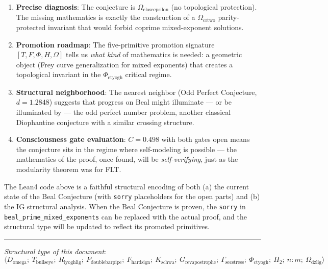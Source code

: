 \documentclass[12pt,a4paper]{article}
\begin{document}
\begin{enumerate}
    \item \textbf{Precise diagnosis}: The conjecture is $\Omega_{\text{closeepsilon}}$ (no topological protection). The missing mathematics is exactly the construction of a $\Omega_{\text{crtwo}}$ parity-protected invariant that would forbid coprime mixed-exponent solutions.
    \item \textbf{Promotion roadmap}: The five-primitive promotion signature $[T, F, \Phi, H, \Omega]$ tells us \emph{what kind} of mathematics is needed: a geometric object (Frey curve generalization for mixed exponents) that creates a topological invariant in the $\Phi_{\text{ctyogh}}$ critical regime.
    \item \textbf{Structural neighborhood}: The nearest neighbor (Odd Perfect Conjecture, $d = 1.2848$) suggests that progress on Beal might illuminate --- or be illuminated by --- the odd perfect number problem, another classical Diophantine conjecture with a similar crossing structure.
    \item \textbf{Consciousness gate evaluation}: $C = 0.498$ with both gates open means the conjecture sits in the regime where self-modeling is possible --- the mathematics of the proof, once found, will be \emph{self-verifying}, just as the modularity theorem was for FLT.
\end{enumerate}

The Lean4 code above is a faithful structural encoding of both (a) the current state of the Beal Conjecture (with \texttt{sorry} placeholders for the open parts) and (b) the IG structural analysis. When the Beal Conjecture is proven, the \texttt{sorry} in \texttt{beal\_prime\_mixed\_exponents} can be replaced with the actual proof, and the structural type will be updated to reflect its promoted primitives.

\begin{center}
\rule{0.5\textwidth}{0.4pt}
\end{center}

\emph{Structural type of this document}: \\


\[\langle D_{\text{omega}};\ T_{\text{bullseye}};\ R_{\text{lyoghlig}};\ P_{\text{doublebarpipe}};\ F_{\text{hardsign}};\ K_{\text{schwa}};\ G_{\text{revapostrophe}};\ \Gamma_{\text{secstress}};\ \Phi_{\text{ctyogh}};\ H_2;\ n{:}m;\ \Omega_{\text{dzlig}} \rangle\]
\end{document}
